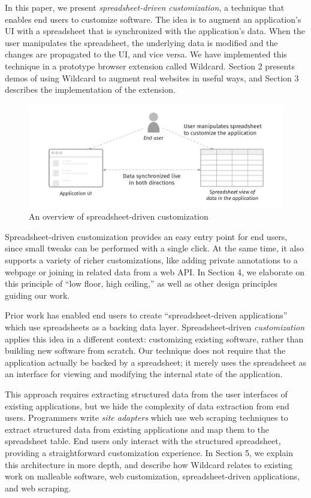 \documentclass[english,submission]{programming}
\begin{document}
In this paper, we present \emph{spreadsheet-driven customization}, a
technique that enables end users to customize software. The idea is to
augment an application's UI with a spreadsheet that is synchronized with
the application's data. When the user manipulates the spreadsheet, the
underlying data is modified and the changes are propagated to the UI,
and vice versa. We have implemented this technique in a prototype
browser extension called Wildcard. Section 2 presents demos of using
Wildcard to augment real websites in useful ways, and Section 3
describes the implementation of the extension.

\begin{figure}
\hypertarget{fig:overview}{%
\centering
\includegraphics{media/overview-300dpi.png}
\caption{An overview of spreadsheet-driven
customization}\label{fig:overview}
}
\end{figure}

Spreadsheet-driven customization provides an easy entry point for end
users, since small tweaks can be performed with a single click. At the
same time, it also supports a variety of richer customizations, like
adding private annotations to a webpage or joining in related data from
a web API. In Section 4, we elaborate on this principle of ``low floor,
high ceiling,'' as well as other design principles guiding our work.

Prior work \autocite{mccutchen2016,benson2014,chang2014} has enabled end
users to create ``spreadsheet-driven applications'' which use
spreadsheets as a backing data layer. Spreadsheet-driven
\emph{customization} applies this idea in a different context:
customizing existing software, rather than building new software from
scratch. Our technique does not require that the application actually be
backed by a spreadsheet; it merely uses the spreadsheet as an interface
for viewing and modifying the internal state of the application.

This approach requires extracting structured data from the user
interfaces of existing applications, but we hide the complexity of data
extraction from end users. Programmers write \emph{site adapters} which
use web scraping techniques to extract structured data from existing
applications and map them to the spreadsheet table. End users only
interact with the structured spreadsheet, providing a straightforward
customization experience. In Section 5, we explain this architecture in
more depth, and describe how Wildcard relates to existing work on
malleable software, web customization, spreadsheet-driven applications,
and web scraping.
\end{document}
